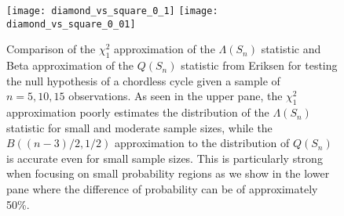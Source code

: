 \begin{figure}[!tbp]
    \centering
    \texttt{[image: diamond\_vs\_square\_0\_1]}
    \newline
    \newline
    \newline
    \texttt{[image: diamond\_vs\_square\_0\_01]}
    \caption{Comparison of the $\chi^2_1$ approximation of the $\Lambda(S_n)$ statistic and Beta approximation of the $Q(S_n)$ statistic from Eriksen \cite{eriksen1996tests} for testing the null hypothesis of a chordless cycle given a sample of $n = 5, 10, 15$ observations. As seen in the upper pane, the $\chi^2_1$ approximation poorly estimates the distribution of the $\Lambda(S_n)$ statistic for small and moderate sample sizes, while the $B((n - 3)/2, 1/2)$ approximation to the distribution of $Q(S_n)$ is accurate even for small sample sizes. This is particularly strong when focusing on small probability regions as we show in the lower pane where the difference of probability can be of approximately 50\%.}
    \label{fig-diamond-vs-square-small}
\end{figure}
